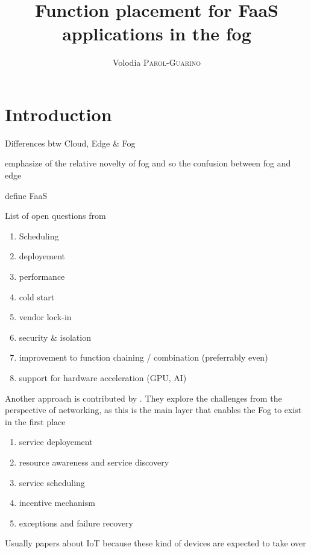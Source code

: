 \documentclass[11pt]{sdm}
\title{Function placement for FaaS applications in the fog}
\author{Volodia \textsc{Parol-Guarino}}
\begin{document}
\maketitle


\section{Introduction}
\begin{itemize}
    \item Differences btw Cloud, Edge \& Fog
    \item emphasize of the relative novelty of fog and so the confusion between fog and edge
    \item define \gls{FaaS}
    \item {List of open questions from \citet{kjorveziroski_iot_2021}
    \begin{enumerate}
        \item Scheduling
        \item deployement
        \item performance
        \item cold start
        \item vendor lock-in
        \item security \& isolation
        \item improvement to function chaining / combination (preferrably even)
        \item support for hardware acceleration (GPU, AI)
    \end{enumerate}
    \item { Another approach is contributed by \citet{xie_when_2021}. They explore the challenges from the perspective of networking, as this is the main layer that enables the Fog to exist in the first place
    \begin{enumerate}
        \item service deployement
        \item resource awareness and service discovery
        \item service scheduling
        \item incentive mechanism
        \item exceptions and failure recovery
    \end{enumerate}
    }
    \item Usually papers about IoT because these kind of devices are expected to take over
}
\end{itemize}
\end{document}
